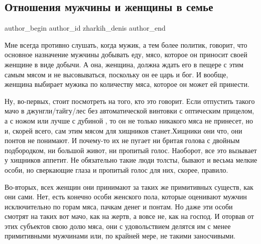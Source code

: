  
 
 
 
 
 
\subsection{Отношения мужчины и женщины в семье}
\label{sec:23_10_2021.fb.zharkih_denis.3.semja_muzhchina_zhenschina}
 
\ifcmt
 author_begin
   author_id zharkih_denis
 author_end
\fi

Мне всегда противно слушать, когда мужик, а тем более политик, говорит, что
основное назначение мужчины добывать еду, мясо, которое он приносит своей
женщине в виде добычи. А она, женщина, должна ждать его в пещере с этим самым
мясом и не высовываться, поскольку он ее царь и бог. И вообще, женщина выбирает
мужика по количеству мяса, которое он может ей принести. 

Ну, во-первых, стоит посмотреть на того, кто это говорит. Если отпустить такого
мачо в джунгли/тайгу/лес без автоматической винтовки с оптическим прицелом, а с
ножом или лучше с дубиной , то он не только никакого мяса не принесет, но и,
скорей всего, сам этим мясом для хищников станет.Хищники они что, они понтов не
понимают. И почему-то их не пугает ни бритая голова с двойным подбородком, ни
большой живот, ни пропитый голос. Наоборот, все это вызывает у хищников
аппетит. Не обязательно такие люди толсты, бывают и весьма мелкие особи, но
сверкающие глаза и пропитый голос для них, скорее, правило. 

Во-вторых, всех женщин они принимают за таких же примитивных существ, как они
сами. Нет, есть конечно особи женского пола, которые оценивают мужчин
исключительно по горам мяса, пачкам денег и понтам. Но даже эти особи смотрят
на таких вот мачо, как на жертв, а вовсе не, как на господ. И оторвав от этих
субъектов свою долю мяса, они с удовольствием делятся им  с менее примитивными
мужчинами или, по крайней мере, не такими заносчивыми. 

